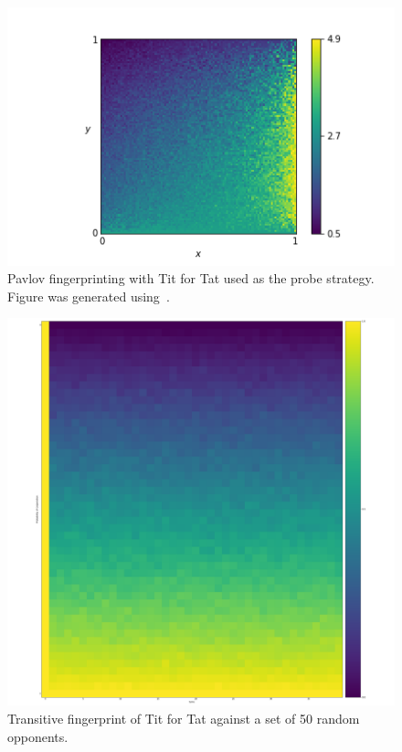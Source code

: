 \begin{figure}[!hbtp]
    \centering
    \includegraphics[height=.3\textheight]{src/chapters/02/img/Win-Stay_Lose-Shift.png}
    \caption{Pavlov fingerprinting with Tit for Tat used as the probe strategy.
    Figure was generated using~\cite{axelrodproject}.}
    \label{fig:fingerprinting}
\end{figure}

\begin{figure}[!hbtp]
    \centering
    \includegraphics[height=.3\textheight]{src/chapters/02/img/Tit_for_Tat_fingerprint.png}
    \caption{Transitive fingerprint of Tit for Tat against a set of 50 random opponents.}
    \label{fig:transitive_fingerprinting}
\end{figure}

